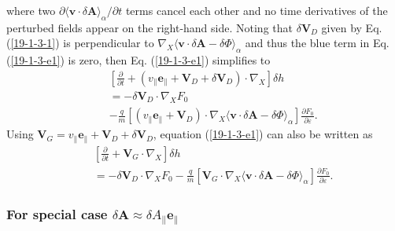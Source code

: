 \documentclass{article}
\begin{document}
where two $\partial \langle \mathbf{v} \cdot \delta \mathbf{A}
\rangle_{\alpha} / \partial t$ terms cancel each other and no time derivatives
of the perturbed fields appear on the right-hand side. Noting that $\delta
\mathbf{V}_D$ given by Eq. (\ref{19-1-3-1}) is perpendicular to $\nabla_X
\langle \mathbf{v} \cdot \delta \mathbf{A}- \delta \Phi \rangle_{\alpha}$ and
thus the blue term in Eq. (\ref{19-1-3-e1}) is zero, then Eq.
(\ref{19-1-3-e1}) simplifies to
\begin{eqnarray}
  &  & \left[ \frac{\partial}{\partial t} + (v_{\parallel}
  \mathbf{e}_{\parallel} +\mathbf{V}_D + \delta \mathbf{V}_D) \cdot \nabla_X
  \right] \delta h \nonumber\\
  &  & = - \delta \mathbf{V}_D \cdot \nabla_X F_0 \nonumber\\
  &  & - \frac{q}{m} [(v_{\parallel} \mathbf{e}_{\parallel} +\mathbf{V}_D)
  \cdot \nabla_X \langle \mathbf{v} \cdot \delta \mathbf{A}- \delta \Phi
  \rangle_{\alpha}] \frac{\partial F_0}{\partial \varepsilon} . 
  \label{19-1-4-e1}
\end{eqnarray}
Using $\mathbf{V}_G = v_{\parallel} \mathbf{e}_{\parallel} +\mathbf{V}_D +
\delta \mathbf{V}_D$, equation (\ref{19-1-3-e1}) can also be written as
\begin{eqnarray}
  &  & \left[ \frac{\partial}{\partial t} +\mathbf{V}_G \cdot \nabla_X
  \right] \delta h \nonumber\\
  &  & = - \delta \mathbf{V}_D \cdot \nabla_X F_0 - \frac{q}{m} [\mathbf{V}_G
  \cdot \nabla_X \langle \mathbf{v} \cdot \delta \mathbf{A}- \delta \Phi
  \rangle_{\alpha}] \frac{\partial F_0}{\partial \varepsilon} . 
  \label{19-3-30-1}
\end{eqnarray}

\subsubsection{For special case $\delta \mathbf{A} \approx \delta
A_{\parallel} \mathbf{e}_{\parallel}$}
\end{document}
